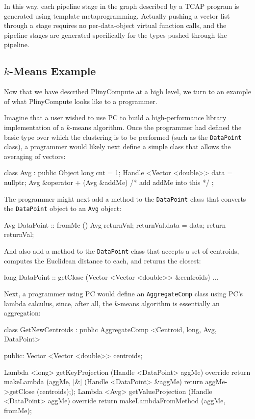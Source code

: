 In this way, each pipeline stage in the graph described by a TCAP program is generated using template metaprogramming.
Actually pushing a vector list through a stage requires no per-data-object virtual function calls, and the pipeline stages
are generated specifically for the types pushed through the pipeline.

\subsection{$k$-Means Example}

Now that we have described PlinyCompute at a high level, we turn to an example of what PlinyCompute looks like to a programmer.

Imagine that a user wished to use PC to build a high-performance library implementation of a $k$-means algorithm.
Once the programmer had defined the basic type over which the clustering is to be performed (such as the
\texttt{DataPoint} class), 
a programmer would likely next define a simple class that allows the averaging of vectors:

\begin{code}
class Avg : public Object {
	long cnt = 1;
	Handle <Vector <double>> data = nullptr;
	Avg &operator + (Avg &addMe) {/* add addMe into this */}
};
\end{code}

\noindent
The programmer might next add a method to the \texttt{DataPoint} class that converts the \texttt{DataPoint} object to an \texttt{Avg} object:

\begin{code}
Avg DataPoint :: fromMe () {
	Avg returnVal;
	returnVal.data = data;
	return returnVal;
}
\end{code}

\noindent
And also add a method to the \texttt{DataPoint} class that accepts a set of centroids, computes the Euclidean distance to
each, and returns the closest:

\begin{code}
long DataPoint :: getClose (Vector <Vector <double>> &centroids) {...}
\end{code}

\noindent
Next, a programmer using PC would define an \texttt{AggregateComp} class using PC's lambda calculus, since, after all, the $k$-means algorithm is essentially 
an aggregation:

\begin{code}
class GetNewCentroids : public AggregateComp <Centroid, long, Avg, DataPoint> {

public:
   Vector <Vector <double>> centroids;

   Lambda <long> getKeyProjection (Handle <DataPoint> aggMe) override {
      return makeLambda (aggMe, [&] (Handle <DataPoint> &aggMe) 
         {return aggMe->getClose (centroids);});
   }
   Lambda <Avg> getValueProjection (Handle <DataPoint> aggMe) override {
      return makeLambdaFromMethod (aggMe, fromMe);
   }
}
\end{code}

